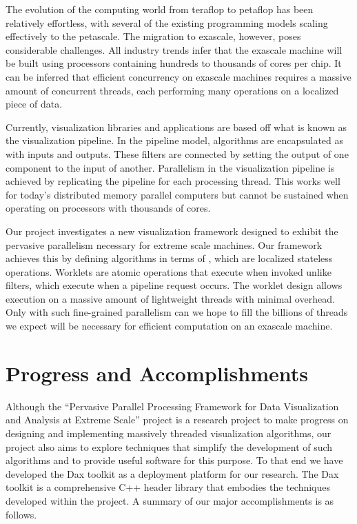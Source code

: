 
The evolution of the computing world from teraflop to petaflop has been
relatively effortless, with several of the existing programming models
scaling effectively to the petascale. The migration to exascale, however,
poses considerable challenges. All industry trends infer that the exascale
machine will be built using processors containing hundreds to thousands of
cores per chip. It can be inferred that efficient concurrency on exascale
machines requires a massive amount of concurrent threads, each performing
many operations on a localized piece of data.

Currently, visualization libraries and applications are based off what is
known as the visualization pipeline. In the pipeline model, algorithms are
encapsulated as  with inputs and outputs. These filters
are connected by setting the output of one component to the input of
another. Parallelism in the visualization pipeline is achieved by
replicating the pipeline for each processing thread. This works well for
today's distributed memory parallel computers but cannot be sustained when
operating on processors with thousands of cores.

Our project investigates a new visualization framework designed to exhibit
the pervasive parallelism necessary for extreme scale machines. Our
framework achieves this by defining algorithms in terms of
, which are localized stateless
operations. Worklets are atomic operations that execute when invoked unlike
filters, which execute when a pipeline request occurs. The worklet design
allows execution on a massive amount of lightweight threads with minimal
overhead. Only with such fine-grained parallelism can we hope to fill the
billions of threads we expect will be necessary for efficient computation
on an exascale machine.


\section*{Progress and Accomplishments}

Although the ``Pervasive Parallel Processing Framework for Data
Visualization and Analysis at Extreme Scale'' project is a research project
to make progress on designing and implementing massively threaded
visualization algorithms, our project also aims to explore techniques that
simplify the development of such algorithms and to provide useful software
for this purpose. To that end we have developed the Dax toolkit as a
deployment platform for our research. The Dax toolkit is a comprehensive
C++ header library that embodies the techniques developed within the
project. A summary of our major accomplishments is as follows.

